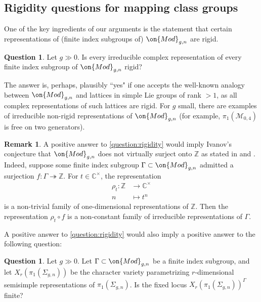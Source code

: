 \documentclass[12 pt]{amsart}
\theoremstyle{plain}
\theoremstyle{definition}
\newtheorem{remark}[subsubsection]{Remark}
\newtheorem{question}[subsubsection]{Question}
\theoremstyle{remark}
\numberwithin{equation}{section}
\begin{document}
\subsection{Rigidity questions for mapping class groups}
One of the key ingredients of our arguments is the statement that certain representations of (finite index subgroups of) $\on{Mod}_{g,n}$ are rigid.
\begin{question}\label{question:rigidity}
Let $g\gg 0$. Is every irreducible complex representation of every finite index subgroup of $\on{Mod}_{g,n}$ rigid?
\end{question}
The answer is, perhaps, plausibly ``yes" if one accepts the well-known analogy
between $\on{Mod}_{g,n}$ and lattices in simple Lie groups of rank $>1$, as
all complex representations of such lattices are rigid.  
For $g$ small, there
are examples of irreducible non-rigid representations of $\on{Mod}_{g,n}$ (for
example, $\pi_1(\mathscr{M}_{0,4})$ is free on two generators). 

\begin{remark}
	\label{remark:}
	A positive answer to \autoref{question:rigidity} would imply Ivanov's
conjecture that $\on{Mod}_{g,n}$ does not virtually surject onto $\mathbb{Z}$
as stated in \cite[\S 7]{Ivanov:problems} and \cite[Problem
2.11.A]{Kirby:problems}. Indeed, suppose some finite index subgroup
$\Gamma\subset \on{Mod}_{g,n}$ admitted a surjection $f: \Gamma
\twoheadrightarrow\mathbb{Z}$. For $t\in \mathbb{C}^\times$, the representation
\begin{align*}
\rho_t: \mathbb{Z} &\to \mathbb{C}^\times \\
n & \mapsto t^n
\end{align*}
is a non-trivial
family of one-dimensional representations of $\mathbb{Z}$. Then the
representation $\rho_t\circ f$ is a non-constant family of irreducible
representations of $\Gamma$.
\end{remark}

A positive answer to \autoref{question:rigidity} would also imply a positive answer to the following question:
\begin{question}\label{question:finite-fixed-points}
Let $g\gg0$. Let $\Gamma\subset \on{Mod}_{g,n}$ be a finite index subgroup, and
let $X_r(\pi_1(\Sigma_{g,n}))$ be the character variety parametrizing
$r$-dimensional semisimple representations of $\pi_1(\Sigma_{g,n})$. Is the fixed locus  $X_r(\pi_1(\Sigma_{g,n}))^\Gamma$ finite?
\end{question}
\end{document}
